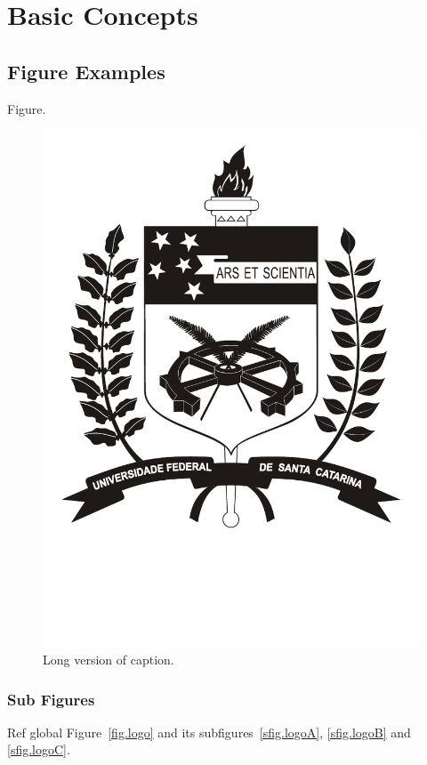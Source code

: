 \chapter{Basic Concepts}
\label{ch.basic}

\section{Figure Examples}

Figure.

\begin{figure}[htb]
    \includegraphics[width=.4\textwidth]{images/ufsc_pb.pdf}
    
    \caption[Short Caption]{
        Long version of caption.
    }
\label{fig.cu}
\end{figure}

\subsection{Sub Figures}
Ref global Figure~\ref{fig.logo} and its subfigures~\ref{sfig.logoA}, \ref{sfig.logoB} and \ref{sfig.logoC}.

